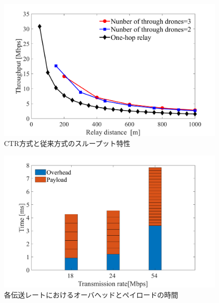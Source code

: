 \documentclass[a4paper,10.5pt]{ltjsarticle}
\begin{document}
\begin{figure}[H]
  \centering
  \includegraphics[width=\linewidth]{throughtput_vs_placement_50m_max_distance_3.pdf} %
  \caption{CTR方式と従来方式のスループット特性}
  \label{fig:throughput_through} %
\end{figure}
\begin{figure}[H]
  \centering
  \includegraphics[width=\linewidth]{throughtput_vs_placement_50m_max_distance_3_2.pdf} %
  \caption{各伝送レートにおけるオーバヘッドとペイロードの時間}
  \label{fig:overhead_vs_paylord} %
\end{figure}

\clearpage
\end{document}
